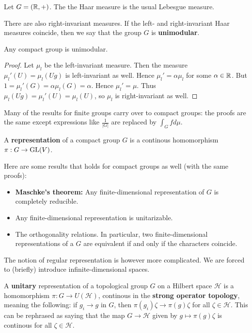 \documentclass[11pt, english]{article}
\begin{document}
\begin{example}
  Let $G=(\mathbb{R},+)$. The the Haar measure is the usual Lebesgue measure.
\end{example}

There are also right-invariant measures. If the left- and right-invariant Haar measures coincide, then we say that the group $G$ is \textbf{unimodular}.

\begin{lemma}
Any compact group is unimodular.  
\end{lemma}
\begin{proof}
 Let $\mu_l$ be the left-invariant measure. Then the measure $\mu_l'(U)= \mu_l(Ug)$ is left-invariant as well. Hence $\mu_l' = \alpha \mu_l$ for some $\alpha \in \mathbb{R}$. But $1=\mu_l'(G) = \alpha \mu_l(G) = \alpha$. Hence $\mu_l'=\mu$.
Thus $\mu_l(Ug)=\mu_l'(U)=\mu_l(U)$, so $\mu_l$ is right-invariant as well.
\end{proof}

Many of the results for finite groups carry over to compact groups: the proofs are the same except expressions like $\frac{1}{\lvert G \rvert}$ are replaced by $\int_G f d \mu$.

A \textbf{representation} of a compact group $G$ is a continous homomorphism $\pi:G \to \operatorname{GL}(V)$.

Here are some results that holds for compact groups as well (with the same proofs):
\begin{itemize}
\item \textbf{Maschke's theorem:} Any finite-dimensional representation of $G$ is completely reducible.
\item Any finite-dimensional representation is unitarizable.
\item The orthogonality relations. In particular, two finite-dimensional representations of a $G$ are equivalent if and only if the characters coincide. 
\end{itemize}

The notion of regular representation is however more complicated. We are forced to (briefly) introduce infinite-dimensional spaces.

A \textbf{unitary} representation of a topological group $G$ on a Hilbert space $\mathcal H$ is a homomorphism $\pi:G \to U(\mathcal H)$, continous in the \textbf{strong operator topology}, meaning the following: if $g_i \to g$ in $G$, then $\pi(g_i) \zeta \to \pi(g)\zeta$ for all $\zeta \in \mathcal H$. This can be rephrased as saying that the map $G \to \mathcal H$ given by $g \mapsto \pi(g) \zeta $ is continous for all $\zeta \in \mathcal H$.
\end{document}
